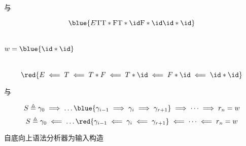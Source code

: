 \begin{frame}{}
  \begin{center}
     与 

    \vspace{-0.30cm}
    \[
      \blue{E \rm T \rm T \ast F \rm T \ast \id \rm F \ast \id \rm \id \ast \id}
    \]

    \vspace{-0.50cm}
    \begin{columns}
        

        \vspace{-0.80cm}
        \[
          w = \blue{\id \ast \id}
        \]
    \end{columns}

    \[
      \red{E \impliedby T \impliedby T \ast F \impliedby T \ast \id \impliedby F \ast \id
        \impliedby \id \ast \id}
    \]
  \end{center}
\end{frame}

\begin{frame}{}
  \begin{center}
     与 

    \[
      S \triangleq \gamma_{0} \implies \dots
        \blue{\gamma_{i-1} \implies \gamma_{i} \implies \gamma_{r+1}}
        \implies \dots \implies r_{n} = w
    \]
    \[
      S \triangleq \gamma_{0} \impliedby \dots
        \red{\gamma_{i-1} \impliedby \gamma_{i} \impliedby \gamma_{r+1}}
        \impliedby \dots \impliedby r_{n} = w
    \]

    \vspace{0.80cm}
    自底向上语法分析器为输入构造
  \end{center}
\end{frame}

